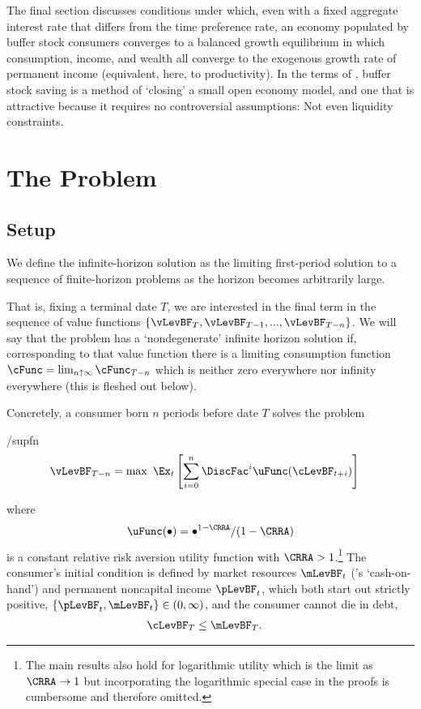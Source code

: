 \documentclass[BufferStockTheory]{subfiles}
\begin{document}
The final section discusses conditions under which, even with a fixed aggregate interest rate that differs from the time preference rate, an economy populated by buffer stock consumers converges to a balanced growth equilibrium in which consumption, income, and wealth all converge to the exogenous growth rate of permanent income (equivalent, here, to productivity). In the terms of \cite{schmitt2003closing}, buffer stock saving is a method of `closing' a small open economy model, and one that is attractive because it requires no controversial assumptions: Not even liquidity constraints.


\hypertarget{The-Problem}{}
\section{The Problem}

\subsection{Setup}
\label{subsec:Setup}

We define the infinite-horizon solution as the limiting first-period solution to a sequence of finite-horizon problems as the horizon becomes arbitrarily large.

That is, fixing a terminal date $T$,  we are interested in the final term in the sequence of value functions $\{\vLevBF_{T},\vLevBF_{T-1},...,\vLevBF_{T-n}\}$.  We will say that the problem has a `nondegenerate' infinite horizon solution if, corresponding to that value function there is a limiting consumption function $\cFunc = \lim_{n \uparrow \infty} \cFunc_{T-n}$ which is neither zero everywhere nor infinity everywhere (this is fleshed out below).

Concretely, a consumer born $n$ periods before date $T$ solves the problem
\begin{verbatimwrite}{\EqDir/supfn}
  \begin{align*}%
    \vLevBF_{T-n} & = \max~ \Ex_{t}\left[\sum_{i=0}^{n} \DiscFac^{i} \uFunc(\cLevBF_{t+i})\right]
  \end{align*}
\end{verbatimwrite}

where
\begin{align}
  \uFunc(\bullet)=\bullet^{1-\CRRA}/(1-\CRRA) \label{eq:crrautil}
\end{align}
is a constant relative risk aversion utility function with $\CRRA > 1$.\footnote{The main
  results also hold for logarithmic utility which is the limit as
  $\CRRA \rightarrow 1$ but incorporating the logarithmic special case
  in the proofs is cumbersome and therefore
  omitted.}  The consumer's initial condition is
defined by market resources $\mLevBF_{t}$ (\cite{deatonLiqConstr}'s
`cash-on-hand') and permanent noncapital income $\pLevBF_{t}$, which
both start out strictly positive, $\{\pLevBF_{t},\mLevBF_{t}\} \in
(0,\infty)$, and the consumer cannot die in debt,
\begin{align}
  \cLevBF_{T} & \leq  \mLevBF_{T} \label{eq:NoDebtAtDeath}.
\end{align}
\end{document}
